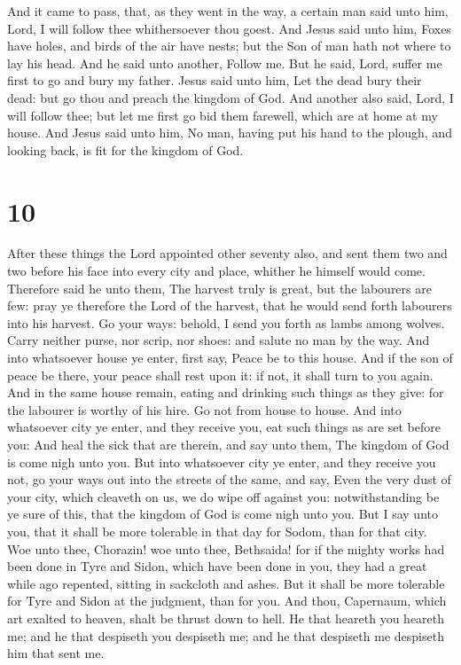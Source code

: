  And it came to pass, that, as they went in the way, a
certain man said unto him, Lord, I will follow thee whithersoever thou
goest.  And Jesus said unto him, Foxes have holes, and
birds of the air have nests; but the Son of man hath not where to lay
his head.  And he said unto another, Follow me. But he
said, Lord, suffer me first to go and bury my father. 
Jesus said unto him, Let the dead bury their dead: but go thou and
preach the kingdom of God.  And another also said, Lord,
I will follow thee; but let me first go bid them farewell, which are at
home at my house.  And Jesus said unto him, No man,
having put his hand to the plough, and looking back, is fit for the
kingdom of God.

\hypertarget{section-9}{%
\section{10}\label{section-9}}

 After these things the Lord appointed other seventy also,
and sent them two and two before his face into every city and place,
whither he himself would come.  Therefore said he unto
them, The harvest truly is great, but the labourers are few: pray ye
therefore the Lord of the harvest, that he would send forth labourers
into his harvest.  Go your ways: behold, I send you forth
as lambs among wolves.  Carry neither purse, nor scrip,
nor shoes: and salute no man by the way.  And into
whatsoever house ye enter, first say, Peace be to this house.
 And if the son of peace be there, your peace shall rest
upon it: if not, it shall turn to you again.  And in the
same house remain, eating and drinking such things as they give: for the
labourer is worthy of his hire. Go not from house to house.
 And into whatsoever city ye enter, and they receive you,
eat such things as are set before you:  And heal the sick
that are therein, and say unto them, The kingdom of God is come nigh
unto you.  But into whatsoever city ye enter, and they
receive you not, go your ways out into the streets of the same, and say,
 Even the very dust of your city, which cleaveth on us,
we do wipe off against you: notwithstanding be ye sure of this, that the
kingdom of God is come nigh unto you.  But I say unto
you, that it shall be more tolerable in that day for Sodom, than for
that city.  Woe unto thee, Chorazin! woe unto thee,
Bethsaida! for if the mighty works had been done in Tyre and Sidon,
which have been done in you, they had a great while ago repented,
sitting in sackcloth and ashes.  But it shall be more
tolerable for Tyre and Sidon at the judgment, than for you.
 And thou, Capernaum, which art exalted to heaven, shalt
be thrust down to hell.  He that heareth you heareth me;
and he that despiseth you despiseth me; and he that despiseth me
despiseth him that sent me.

